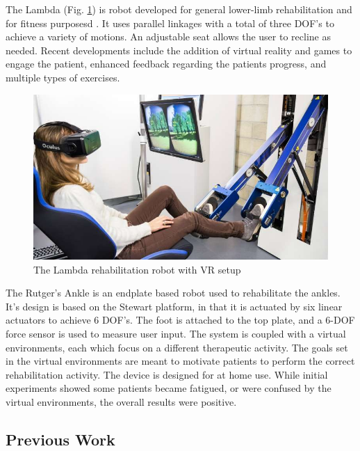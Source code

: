 \documentclass[12pt]{report}
\begin{document}
	The Lambda (Fig. \ref{fig:Lambda}) is robot developed for general lower-limb rehabilitation and for fitness purposesd \cite{Bouri2009}. It uses parallel linkages with a total of three DOF's to achieve a variety of motions. An adjustable seat allows the user to recline as needed. Recent developments include the addition of virtual reality and games to engage the patient, enhanced feedback regarding the patients progress, and multiple types of exercises. 
	
	\begin{figure}[t] 
		\centering
		\includegraphics[width=0.75\linewidth]{Lambda}
		\caption{The Lambda rehabilitation robot with VR setup}
		\label{fig:Lambda}
	\end{figure}
	
	The Rutger's Ankle \cite{Burdea2000} is an endplate based robot used to rehabilitate the ankles. It's design is based on the Stewart platform, in that it is actuated by six linear actuators to achieve 6 DOF's. The foot is attached to the top plate, and a 6-DOF force sensor is used to measure user input. The system is coupled with a virtual environments, each which focus on a different therapeutic activity. The goals set in the virtual environments are meant to motivate patients to perform the correct rehabilitation activity. The device is designed for at home use. While initial experiments showed some patients became fatigued, or were confused by the virtual environments, the overall results were positive. 

\subsection{Previous Work} 	
\end{document}
